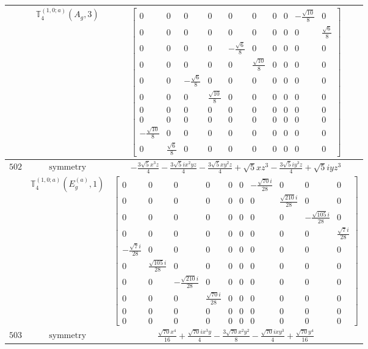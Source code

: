 \documentclass[fleqn,8pt,landscape]{jsarticle}
\begin{document}
\begin{longtable}{ccc}
$  $ & $ \mathbb{T}_{4}^{(1,0;a)}(A_{g},3) $ & $ \begin{bmatrix} 0 & 0 & 0 & 0 & 0 & 0 & 0 & 0 & - \frac{\sqrt{10}}{8} & 0 \\ 0 & 0 & 0 & 0 & 0 & 0 & 0 & 0 & 0 & \frac{\sqrt{6}}{8} \\ 0 & 0 & 0 & 0 & - \frac{\sqrt{6}}{8} & 0 & 0 & 0 & 0 & 0 \\ 0 & 0 & 0 & 0 & 0 & \frac{\sqrt{10}}{8} & 0 & 0 & 0 & 0 \\ 0 & 0 & - \frac{\sqrt{6}}{8} & 0 & 0 & 0 & 0 & 0 & 0 & 0 \\ 0 & 0 & 0 & \frac{\sqrt{10}}{8} & 0 & 0 & 0 & 0 & 0 & 0 \\ 0 & 0 & 0 & 0 & 0 & 0 & 0 & 0 & 0 & 0 \\ 0 & 0 & 0 & 0 & 0 & 0 & 0 & 0 & 0 & 0 \\ - \frac{\sqrt{10}}{8} & 0 & 0 & 0 & 0 & 0 & 0 & 0 & 0 & 0 \\ 0 & \frac{\sqrt{6}}{8} & 0 & 0 & 0 & 0 & 0 & 0 & 0 & 0 \end{bmatrix} $ \\ \hline
$ 502 $ & $ \text{symmetry} $ & $ - \frac{3 \sqrt{5} x^{3} z}{4} - \frac{3 \sqrt{5} i x^{2} y z}{4} - \frac{3 \sqrt{5} x y^{2} z}{4} + \sqrt{5} x z^{3} - \frac{3 \sqrt{5} i y^{3} z}{4} + \sqrt{5} i y z^{3} $ \\
$  $ & $ \mathbb{T}_{4}^{(1,0;a)}(E_{g}^{(a)},1) $ & $ \begin{bmatrix} 0 & 0 & 0 & 0 & 0 & 0 & - \frac{\sqrt{70} i}{28} & 0 & 0 & 0 \\ 0 & 0 & 0 & 0 & 0 & 0 & 0 & \frac{\sqrt{210} i}{28} & 0 & 0 \\ 0 & 0 & 0 & 0 & 0 & 0 & 0 & 0 & - \frac{\sqrt{105} i}{28} & 0 \\ 0 & 0 & 0 & 0 & 0 & 0 & 0 & 0 & 0 & \frac{\sqrt{7} i}{28} \\ - \frac{\sqrt{7} i}{28} & 0 & 0 & 0 & 0 & 0 & 0 & 0 & 0 & 0 \\ 0 & \frac{\sqrt{105} i}{28} & 0 & 0 & 0 & 0 & 0 & 0 & 0 & 0 \\ 0 & 0 & - \frac{\sqrt{210} i}{28} & 0 & 0 & 0 & 0 & 0 & 0 & 0 \\ 0 & 0 & 0 & \frac{\sqrt{70} i}{28} & 0 & 0 & 0 & 0 & 0 & 0 \\ 0 & 0 & 0 & 0 & 0 & 0 & 0 & 0 & 0 & 0 \\ 0 & 0 & 0 & 0 & 0 & 0 & 0 & 0 & 0 & 0 \end{bmatrix} $ \\ \hline
$ 503 $ & $ \text{symmetry} $ & $ \frac{\sqrt{70} x^{4}}{16} + \frac{\sqrt{70} i x^{3} y}{4} - \frac{3 \sqrt{70} x^{2} y^{2}}{8} - \frac{\sqrt{70} i x y^{3}}{4} + \frac{\sqrt{70} y^{4}}{16} $ \\

\end{longtable}
\end{document}
